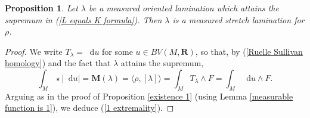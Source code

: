 \documentclass[reqno,11pt]{amsart}
\newcommand{\RR}{\mathbf{R}}
\newcommand*\dif{\mathop{}\!\mathrm{d}}
\newcommand{\Mass}{\mathbf M}
\newcommand{\Comass}{\mathbf L}
\newtheorem{proposition}[theorem]{Proposition}
\newtheorem{corollary}[theorem]{Corollary}
\theoremstyle{definition}
\numberwithin{equation}{section}
\begin{document}
\begin{proposition}\label{calibrated means measured stretch}
Let $\lambda$ be a measured oriented lamination which attains the supremum in (\ref{L equals K formula}).
Then $\lambda$ is a measured stretch lamination for $\rho$.
\end{proposition}
\begin{proof}
We write $T_\lambda = \dif u$ for some $u \in BV(M, \RR)$, so that, by (\ref{Ruelle Sullivan homology}) and the fact that $\lambda$ attains the supremum,
$$\int_M \star |\dif u| = \Mass(\lambda) = \langle \rho, [\lambda]\rangle = \int_M T_\lambda \wedge F = \int_M \dif u \wedge F.$$
Arguing as in the proof of Proposition \ref{existence 1} (using Lemma \ref{measurable function is 1}), we deduce (\ref{1 extremality}).
\end{proof}





\end{document}
